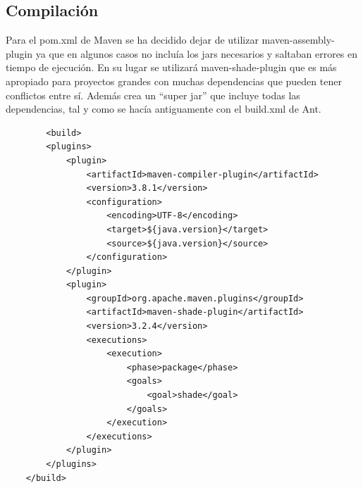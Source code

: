 \subsection{Compilación}

Para el pom.xml de Maven se ha decidido dejar de utilizar maven-assembly-plugin ya que en algunos casos no
incluía los jars necesarios y saltaban errores en tiempo de ejecución. En su lugar se utilizará
maven-shade-plugin que es más apropiado para proyectos grandes con muchas dependencias que pueden tener
conflictos entre sí. Además crea un ``super jar'' que incluye todas las dependencias, tal y como se hacía antiguamente
con el build.xml de Ant.

\begin{lstlisting}
        <build>
        <plugins>
            <plugin>
                <artifactId>maven-compiler-plugin</artifactId>
                <version>3.8.1</version>
                <configuration>
                    <encoding>UTF-8</encoding>
                    <target>${java.version}</target>
                    <source>${java.version}</source>
                </configuration>
            </plugin>
            <plugin>
                <groupId>org.apache.maven.plugins</groupId>
                <artifactId>maven-shade-plugin</artifactId>
                <version>3.2.4</version>
                <executions>
                    <execution>
                        <phase>package</phase>
                        <goals>
                            <goal>shade</goal>
                        </goals>
                    </execution>
                </executions>
            </plugin>
        </plugins>
    </build>
\end{lstlisting}

